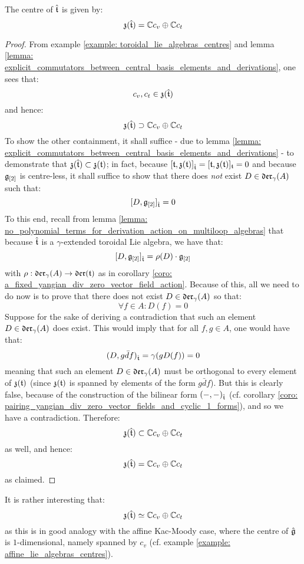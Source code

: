         \begin{proposition} \label{prop: centres_of_yangian_extended_toroidal_lie_algebras}
            The centre of $\hat{\mathfrak{t}}$ is given by:
                $$\mathfrak{z}(\hat{\mathfrak{t}}) = \mathbb{C} c_v \oplus \mathbb{C} c_t$$
        \end{proposition}
            \begin{proof}
                From example \ref{example: toroidal_lie_algebras_centres} and lemma \ref{lemma: explicit_commutators_between_central_basis_elements_and_derivations}, one sees that:
                    $$c_v, c_t \in \mathfrak{z}(\hat{\mathfrak{t}})$$
                and hence:
                    $$\mathfrak{z}(\hat{\mathfrak{t}}) \supset \mathbb{C} c_v \oplus \mathbb{C} c_t$$
                To show the other containment, it shall suffice - due to lemma \ref{lemma: explicit_commutators_between_central_basis_elements_and_derivations} - to demonstrate that $\mathfrak{z}(\hat{\mathfrak{t}}) \subset \mathfrak{z}(\mathfrak{t})$; in fact, because $[\mathfrak{t}, \mathfrak{z}(\mathfrak{t})]_{\hat{\mathfrak{t}}} = [\mathfrak{t}, \mathfrak{z}(\mathfrak{t})]_{\mathfrak{t}} = 0$ and because $\mathfrak{g}_{[2]}$ is centre-less, it shall suffice to show that there does \textit{not} exist $D \in \mathfrak{der}_{\gamma}(A)$ such that:
                    $$[D, \mathfrak{g}_{[2]}]_{\hat{\mathfrak{t}}} = 0$$
                To this end, recall from lemma \ref{lemma: no_polynomial_terms_for_derivation_action_on_multiloop_algebras} that because $\hat{\mathfrak{t}}$ is a $\gamma$-extended toroidal Lie algebra, we have that:
                    $$[D, \mathfrak{g}_{[2]}]_{\hat{\mathfrak{t}}} = \rho(D) \cdot \mathfrak{g}_{[2]}$$
                with $\rho: \mathfrak{der}_{\gamma}(A) \to \mathfrak{der}(\mathfrak{t})$ as in corollary \ref{coro: a_fixed_yangian_div_zero_vector_field_action}. Because of this, all we need to do now is to prove that there does not exist $D \in \mathfrak{der}_{\gamma}(A)$ so that:
                    $$\forall f \in A: D(f) = 0$$
                Suppose for the sake of deriving a contradiction that such an element $D \in \mathfrak{der}_{\gamma}(A)$ does exist. This would imply that for all $f, g \in A$, one would have that:
                    $$(D, g \bar{d}f)_{\hat{\mathfrak{t}}} = \gamma( g D(f) ) = 0$$
                meaning that such an element $D \in \mathfrak{der}_{\gamma}(A)$ must be orthogonal to every element of $\mathfrak{z}(\mathfrak{t})$ (since $\mathfrak{z}(\mathfrak{t})$ is spanned by elements of the form $g \bar{d}f$). But this is clearly false, because of the construction of the bilinear form $(-, -)_{\hat{\mathfrak{t}}}$ (cf. corollary \ref{coro: pairing_yangian_div_zero_vector_fields_and_cyclic_1_forms}), and so we have a contradiction. Therefore:
                    $$\mathfrak{z}(\hat{\mathfrak{t}}) \subset \mathbb{C} c_v \oplus \mathbb{C} c_t$$
                as well, and hence:
                    $$\mathfrak{z}(\hat{\mathfrak{t}}) = \mathbb{C} c_v \oplus \mathbb{C} c_t$$
                as claimed.
            \end{proof}
        \begin{remark}
            It is rather interesting that:
                $$\mathfrak{z}(\hat{\mathfrak{t}}) \simeq \mathbb{C} c_v \oplus \mathbb{C} c_t$$
            as this is in good analogy with the affine Kac-Moody case, where the centre of $\hat{\mathfrak{g}}$ is $1$-dimensional, namely spanned by $c_v$ (cf. example \ref{example: affine_lie_algebras_centres}).
        \end{remark}


